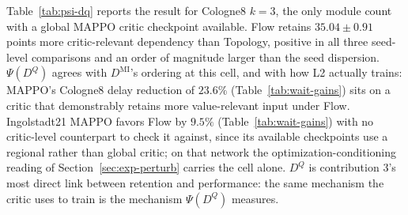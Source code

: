 \documentclass[journal]{IEEEtran}
\theoremstyle{definition}
\begin{document}
Table~\ref{tab:psi-dq} reports the result for Cologne8 $k=3$, the only module count with a global MAPPO critic checkpoint available.
Flow retains $35.04\pm0.91$ points more critic-relevant dependency than Topology, positive in all three seed-level comparisons and an order of magnitude larger than the seed dispersion. $\Psi(D^{Q})$ agrees with $D^{\mathrm{MI}}$'s ordering at this cell, and with how L2 actually trains: MAPPO's Cologne8 delay reduction of $23.6\%$ (Table~\ref{tab:wait-gains}) sits on a critic that demonstrably retains more value-relevant input under Flow.
Ingolstadt21 MAPPO favors Flow by $9.5\%$ (Table~\ref{tab:wait-gains}) with no critic-level counterpart to check it against, since its available checkpoints use a regional rather than global critic; on that network the optimization-conditioning reading of Section~\ref{sec:exp-perturb} carries the cell alone. $D^Q$ is contribution 3's most direct link between retention and performance: the same mechanism the critic uses to train is the mechanism $\Psi(D^Q)$ measures.

%
\end{document}
